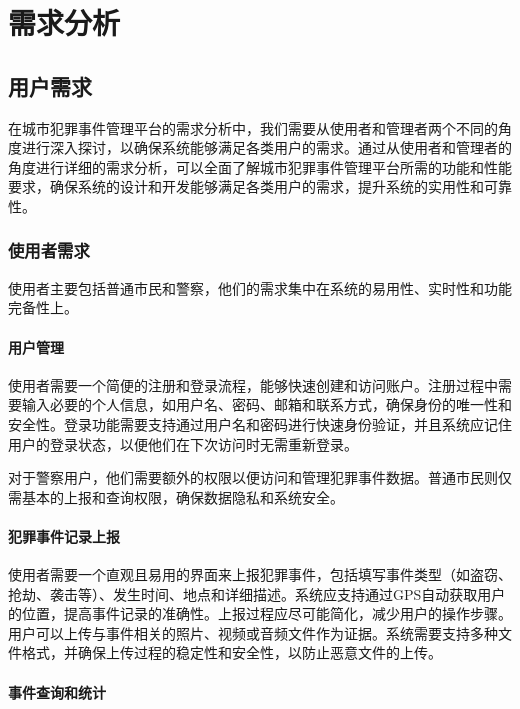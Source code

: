 \section{需求分析}

\subsection{用户需求}

在城市犯罪事件管理平台的需求分析中，我们需要从使用者和管理者两个不同的角度进行深入探讨，以确保系统能够满足各类用户的需求。通过从使用者和管理者的角度进行详细的需求分析，可以全面了解城市犯罪事件管理平台所需的功能和性能要求，确保系统的设计和开发能够满足各类用户的需求，提升系统的实用性和可靠性。




\subsubsection{使用者需求}

使用者主要包括普通市民和警察，他们的需求集中在系统的易用性、实时性和功能完备性上。



\paragraph{用户管理}

使用者需要一个简便的注册和登录流程，能够快速创建和访问账户。注册过程中需要输入必要的个人信息，如用户名、密码、邮箱和联系方式，确保身份的唯一性和安全性。登录功能需要支持通过用户名和密码进行快速身份验证，并且系统应记住用户的登录状态，以便他们在下次访问时无需重新登录。

对于警察用户，他们需要额外的权限以便访问和管理犯罪事件数据。普通市民则仅需基本的上报和查询权限，确保数据隐私和系统安全。

\paragraph{犯罪事件记录上报}

使用者需要一个直观且易用的界面来上报犯罪事件，包括填写事件类型（如盗窃、抢劫、袭击等）、发生时间、地点和详细描述。系统应支持通过GPS自动获取用户的位置，提高事件记录的准确性。上报过程应尽可能简化，减少用户的操作步骤。用户可以上传与事件相关的照片、视频或音频文件作为证据。系统需要支持多种文件格式，并确保上传过程的稳定性和安全性，以防止恶意文件的上传。

\paragraph{事件查询和统计}


